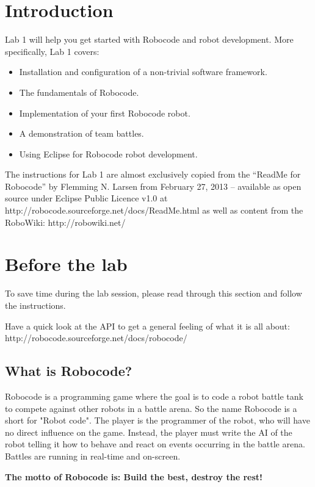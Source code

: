 \documentclass{scrreprt}
\begin{document}
\chapter{Introduction}
Lab 1 will help you get started with Robocode and robot development. More specifically, Lab 1 covers:

\begin{itemize}
\item Installation and configuration of a non-trivial software framework.
\item The fundamentals of Robocode.
\item Implementation of your first Robocode robot.
\item A demonstration of team battles. 
\item Using Eclipse for Robocode robot development.
\end{itemize}

The instructions for Lab 1 are almost exclusively copied from the ``ReadMe for Robocode'' by Flemming N. Larsen from February 27, 2013 -- available as open source under Eclipse Public Licence v1.0 at http://robocode.sourceforge.net/docs/ReadMe.html as well as content from the RoboWiki: http://robowiki.net/

\chapter{Before the lab}
To save time during the lab session, please read through this section and follow the instructions.

Have a quick look at the API to get a general feeling of what it is all about:\\ 
http://robocode.sourceforge.net/docs/robocode/

\section{What is Robocode?}
Robocode is a programming game where the goal is to code a robot battle tank to compete against other robots in a battle arena. So the name Robocode is a short for "Robot code". The player is the programmer of the robot, who will have no direct influence on the game. Instead, the player must write the AI of the robot telling it how to behave and react on events occurring in the battle arena. Battles are running in real-time and on-screen.

\begin{center}
\textbf{The motto of Robocode is: Build the best, destroy the rest!}
\end{center}
\end{document}
